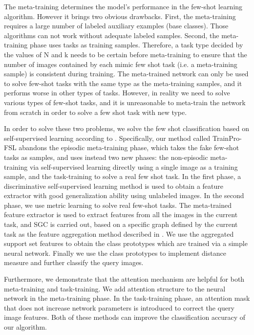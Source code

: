 \documentclass[conference]{IEEEtran}
\begin{document}
The meta-training determines the model’s performance in the few-shot learning algorithm. However it brings two obvious drawbacks. First, the meta-training requires a large number of labeled auxiliary examples (base classes). Those algorithms can not work without adequate labeled samples. Second, the meta-training phase uses tasks as training samples. Therefore, a task type decided by the values of N and k needs to be certain before meta-training to ensure that the number of images contained by each mimic few shot task (i.e. a meta-training sample) is consistent during training. The meta-trained network can only be used to solve few-shot tasks with the same type as the meta-training samples, and it performs worse in other types of tasks. However, in reality we need to solve various types of few-shot tasks, and it is unreasonable to meta-train the network from scratch in order to solve a few shot task with new type.


In order to solve these two problems, we solve the few shot classification based on self-supervised learning according to \cite{li2020few}. Specifically, our method called  TrainPro-FSL abandons the episodic meta-training phase, which takes the fake few-shot tasks as samples, and uses instead two new phases: the non-episodic meta-training via self-supervised learning directly using a single image as a training sample, and the task-training to solve a real few shot task. In the first phase, a discriminative self-supervised learning method is used to obtain a feature extractor with good generalization ability using unlabeled images. In the second phase, we use metric learning to solve real few-shot tasks. The meta-trained feature extractor is used to extract features from all the images in the current task, and SGC is carried out, based on a specific graph defined by the current task as the feature aggregation method described in \cite{li2020few}. We use the aggregated support set features to obtain the class prototypes which are trained via a simple neural network. Finally we use the class prototypes to implement distance measure and further classify the query images.


Furthermore, we demonstrate that the attention mechanism are helpful for both meta-training and task-training. We add attention structure to the neural network in the meta-training phase. In the task-training phase, an attention mask that does not increase network parameters is introduced to correct the query image features. Both of these methods can improve the classification accuracy of our algorithm.
\end{document}
